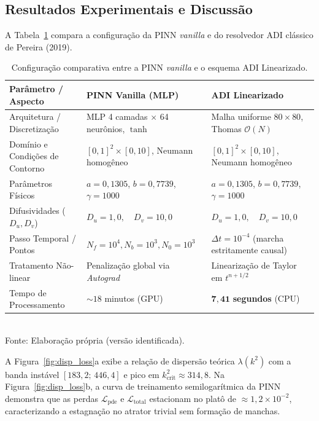 \documentclass[a4paper, 12pt, twoside]{article}
\begin{document}
\subsection{Resultados Experimentais e Discussão}

A Tabela~\ref{tab:config_schnak} compara a configuração da PINN \textit{vanilla} e do resolvedor
ADI clássico de Pereira (2019).

\begin{table}[!ht]
  \caption{Configuração comparativa entre a PINN \textit{vanilla} e o esquema ADI Linearizado.}
  \label{tab:config_schnak}
  \centering
  \footnotesize{}
  \begin{tabular}{p{4.2cm}p{5.5cm}p{5.5cm}}
    \toprule
    \textbf{Parâmetro / Aspecto} & \textbf{PINN Vanilla (MLP)} & \textbf{ADI Linearizado \cite{pereira2019}} \\
    \midrule
    Arquitetura / Discretização & MLP 4 camadas $\times$ 64 neurônios, $\tanh$ & Malha uniforme $80 \times 80$, Thomas $\mathcal{O}(N)$ \\
    Domínio e Condições de Contorno & $[0,1]^2 \times [0,10]$, Neumann homogêneo & $[0,1]^2 \times [0,10]$, Neumann homogêneo \\
    Parâmetros Físicos & $a=0{,}1305$, $b=0{,}7739$, $\gamma=1000$ & $a=0{,}1305$, $b=0{,}7739$, $\gamma=1000$ \\
    Difusividades ($D_u, D_v$) & $D_u = 1{,}0, \quad D_v = 10{,}0$ & $D_u = 1{,}0, \quad D_v = 10{,}0$ \\
    Passo Temporal / Pontos & $N_f = 10^4, N_b = 10^3, N_0 = 10^3$ & $\Delta t = 10^{-4}$ (marcha estritamente causal) \\
    Tratamento Não-linear & Penalização global via \textit{Autograd} & Linearização de Taylor em $t^{n+1/2}$ \\
    Tempo de Processamento & $\sim 18$ minutos (GPU) & $\mathbf{7{,}41}$ \textbf{segundos} (CPU) \\
    \bottomrule
  \end{tabular}\\[2pt]
  {\footnotesize Fonte: Elaboração própria (versão identificada).}
\end{table}

A Figura~\ref{fig:disp_loss}a exibe a relação de dispersão teórica $\lambda(k^2)$ com a banda
instável $[183{,}2;\, 446{,}4]$ e pico em $k_{\mathrm{crit}}^2 \approx 314{,}8$.
Na Figura~\ref{fig:disp_loss}b, a curva de treinamento semilogarítmica da PINN demonstra
que as perdas $\mathcal{L}_{\mathrm{pde}}$ e $\mathcal{L}_{\mathrm{total}}$ estacionam no
platô de $\approx 1{,}2 \times 10^{-2}$, caracterizando a estagnação no atrator trivial
sem formação de manchas.
\end{document}
